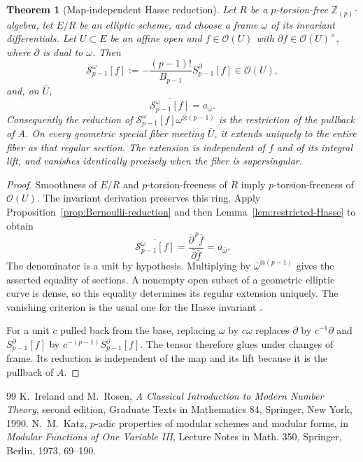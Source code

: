 \documentclass[10pt,a4paper]{amsart}
\newtheorem{thm}{Theorem}[section]
\numberwithin{equation}{section}
\begin{document}
\begin{thm}[Map-independent Hasse reduction]\label{thm:general-Hasse}
Let $R$ be a $p$-torsion-free $\mathbb Z_{(p)}$-algebra, let $E/R$ be
an elliptic scheme, and choose a frame $\omega$ of its invariant
differentials. Let $U\subset E$ be an affine open and $f\in\mathcal O(U)$
with $\partial f\in\mathcal O(U)^\times$, where $\partial$ is dual to
$\omega$. Then
\[
\mathcal S_{p-1}^\omega[f]
:=-\frac{(p-1)!}{B_{p-1}}S_{p-1}^\partial[f]
\in\mathcal O(U),
\]
and, on $\bar U$,
\begin{equation}\label{eq:general-Hasse-reduction}
\overline{\mathcal S_{p-1}^\omega[f]}=a_{\bar\omega}.
\end{equation}
Consequently the reduction of
$\mathcal S_{p-1}^\omega[f]\omega^{\otimes(p-1)}$
is the restriction of the pullback of $A$. On every geometric special
fiber meeting $\bar U$, it extends uniquely to the entire fiber as
that regular section. The extension is independent of $f$ and of its
integral lift, and vanishes identically precisely when the fiber is
supersingular.
\end{thm}

\begin{proof}
Smoothness of $E/R$ and $p$-torsion-freeness of $R$ imply
$p$-torsion-freeness of $\mathcal O(U)$. The invariant derivation
preserves this ring. Apply Proposition~\ref{prop:Bernoulli-reduction}
and then Lemma~\ref{lem:restricted-Hasse} to obtain
\[
\overline{\mathcal S_{p-1}^\omega[f]}
=\frac{\bar\partial^{\,p}\bar f}{\bar\partial\bar f}
=a_{\bar\omega}.
\]
The denominator is a unit by hypothesis. Multiplying by
$\bar\omega^{\otimes(p-1)}$ gives the asserted equality of sections.
A nonempty open subset of a geometric elliptic curve is dense, so this
equality determines its regular extension uniquely. The vanishing
criterion is the usual one for the Hasse invariant
\cite[\S2.0]{katz}.

For a unit $c$ pulled back from the base, replacing $\omega$ by
$c\omega$ replaces $\partial$ by $c^{-1}\partial$ and
$S_{p-1}^\partial[f]$ by $c^{-(p-1)}S_{p-1}^\partial[f]$.
The tensor therefore glues under changes of frame. Its reduction is
independent of the map and its lift because it is the pullback of $A$.
\end{proof}

\begin{thebibliography}{99}
 K.~Ireland and M.~Rosen, \emph{A Classical Introduction to Modern Number Theory}, second edition, Graduate Texts in Mathematics 84, Springer, New York, 1990.
 N.~M.~Katz, $p$-adic properties of modular schemes and modular forms, in \emph{Modular Functions of One Variable III}, Lecture Notes in Math. 350, Springer, Berlin, 1973, 69--190.
\end{thebibliography}
\end{document}
